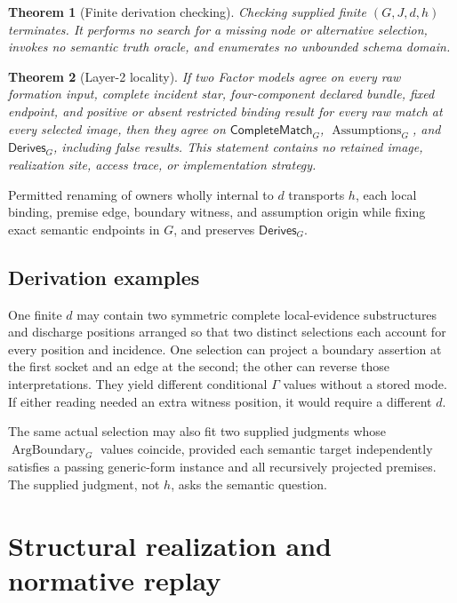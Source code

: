 \documentclass[11pt,twoside]{article}
\newcommand{\Derives}{\mathsf{Derives}}
\newcommand{\CompleteMatch}{\mathsf{CompleteMatch}}
\newtheorem{theorem}{Theorem}
\begin{document}
\begin{theorem}[Finite derivation checking]\label{thm:derivation-termination}
Checking supplied finite \((G,J,d,h)\) terminates.  It performs no search for a
missing node or alternative selection, invokes no semantic truth oracle, and
enumerates no unbounded schema domain.
\end{theorem}

\begin{theorem}[Layer-2 locality]\label{thm:proof-locality}
If two Factor models agree on every raw formation input, complete incident star,
four-component declared bundle, fixed endpoint, and positive or absent restricted
binding result for every raw match at every selected image, then they agree on
\(\CompleteMatch_G\), \(\operatorname{Assumptions}_G\), and \(\Derives_G\),
including false results.  This statement contains no retained image, realization
site, access trace, or implementation strategy.
\end{theorem}

Permitted renaming of owners wholly internal to \(d\) transports \(h\), each local
binding, premise edge, boundary witness, and assumption origin while fixing exact
semantic endpoints in \(G\), and preserves \(\Derives_G\).

\subsection{Derivation examples}

One finite \(d\) may contain two symmetric complete local-evidence substructures
and discharge positions arranged so that two distinct selections each account for
every position and incidence.  One selection can project a boundary assertion at
the first socket and an edge at the second; the other can reverse those
interpretations.  They yield different conditional \(\Gamma\) values without a
stored mode.  If either reading needed an extra witness position, it would require
a different \(d\).

The same actual selection may also fit two supplied judgments whose
\(\operatorname{ArgBoundary}_G\) values coincide, provided each semantic target
independently satisfies a passing generic-form instance and all recursively
projected premises.  The supplied judgment, not \(h\), asks the semantic question.

\section{Structural realization and normative replay}\label{sec:replay}
\end{document}
